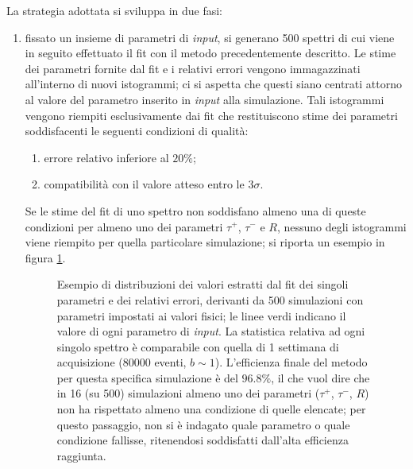 \documentclass[10pt, oneside, a4paper]{article}   	%
\begin{document}
\newpage La strategia adottata si sviluppa in due fasi:
\begin{enumerate}
 \item fissato un insieme di parametri di \textit{input}, si generano 500 spettri di cui viene in seguito effettuato il fit con il metodo precedentemente descritto. Le stime dei parametri fornite dal fit e i relativi errori vengono immagazzinati all'interno di nuovi istogrammi; ci si aspetta che questi siano centrati attorno al valore del parametro inserito in \textit{input} alla simulazione. Tali istogrammi vengono riempiti esclusivamente dai fit che restituiscono stime dei parametri soddisfacenti le seguenti condizioni di qualità:
 \begin{enumerate}
  \item errore relativo inferiore al $20\%$;
  \item compatibilità con il valore atteso entro le $3\sigma$. 
 \end{enumerate}
 Se le stime del fit di uno spettro non soddisfano almeno una di queste condizioni per almeno uno dei parametri $\tau^+$, $\tau^-$ e $R$, nessuno degli istogrammi viene riempito per quella particolare simulazione; si riporta un esempio in figura \ref{fig::esempio_set_simulazioni}.
%
\begin{figure}[b!]
  \centering
  
  \caption{Esempio di distribuzioni dei valori estratti dal fit dei singoli parametri e dei relativi errori, derivanti da 500 simulazioni con parametri impostati ai valori fisici; le linee verdi indicano il valore di ogni parametro di \textit{input}. La statistica relativa ad ogni singolo spettro è comparabile con quella di 1 settimana di acquisizione ($ 80000$ eventi, $b\sim1$). L'efficienza finale del metodo per questa specifica simulazione è del $96.8\%$, il che vuol dire che in 16 (su 500) simulazioni almeno uno dei parametri ($\tau^+$, $\tau^-$, $R$) non ha rispettato almeno una condizione di quelle elencate; per questo passaggio, non si è indagato quale parametro o quale condizione fallisse, ritenendosi soddisfatti dall'alta efficienza raggiunta.}
  \label{fig::esempio_set_simulazioni}
 \end{figure}
 

\end{enumerate}
\end{document}
